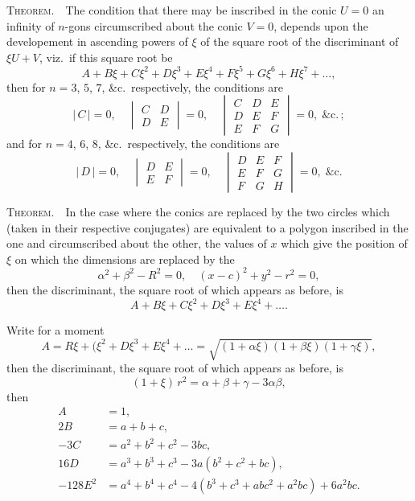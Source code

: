 \documentclass[11pt,a4paper]{book}
\begin{document}
\noindent\textsc{Theorem.}\ \ The condition that there may be inscribed in the conic $U=0$ an
infinity of $n$-gons circumscribed about the conic $V=0$, depends upon the developement
in ascending powers of $\xi$ of the square root of the discriminant of $\xi U + V$, viz.\ if
this square root be
\[
A + B\xi + C\xi^2 + D\xi^3 + E\xi^4 + F\xi^5 + G\xi^6 + H\xi^7 + \ldots ,
\]
then for $n = 3$, $5$, $7$, \&c.\ respectively, the conditions are
\[
\big|\,C\,\big|=0,\quad
\begin{vmatrix} C & D \\ D & E \end{vmatrix} = 0,\quad
\begin{vmatrix} C & D & E \\ D & E & F \\ E & F & G \end{vmatrix} = 0,\;\&\mathrm{c.\,;}
\]
and for $n = 4$, $6$, $8$, \&c.\ respectively, the conditions are
\[
\big|\,D\,\big|=0,\quad
\begin{vmatrix} D & E \\ E & F \end{vmatrix} = 0,\quad
\begin{vmatrix} D & E & F \\ E & F & G \\ F & G & H \end{vmatrix} = 0,\;\&\mathrm{c.}
\]

\medskip

\noindent\textsc{Theorem.}\ \ In the case where the conics are replaced by the two circles
which (taken in their respective conjugates) are equivalent to a polygon inscribed
in the one and circumscribed about the other, the values of $x$ which give the position
of $\xi$ on which the dimensions are replaced by the
\[
\alpha^2 + \beta^2 - R^2 = 0,\quad(x-c)^2 + y^2 - r^2 = 0,
\]
then the discriminant, the square root of which appears as before, is
\[
A + B\xi + C\xi^2 + D\xi^3 + E\xi^4 + \ldots .
\]

\medskip

Write for a moment
\[
A = R\xi + (\xi^2 + D\xi^3 + E\xi^4 + \ldots = \sqrt{(1+\alpha\xi)(1+\beta\xi)(1+\gamma\xi)},
\]
then the discriminant, the square root of which appears as before, is
\[
(1+\xi)\,r^2 = \alpha + \beta + \gamma - 3\alpha\beta,
\]
then
\begin{align*}
A &= 1, \\
2B &= a + b + c, \\
-3C &= a^2 + b^2 + c^2 - 3bc, \\
16D &= a^3 + b^3 + c^3 - 3a(b^2 + c^2 + bc), \\
-128E^2 &= a^4 + b^4 + c^4 - 4(b^3 + c^3 + abc^2 + a^2bc) + 6a^2bc.
\end{align*}
\end{document}
